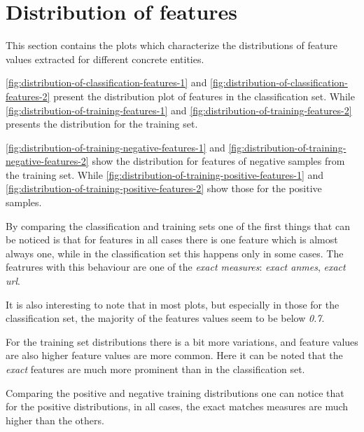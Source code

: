 \documentclass[epsfig,a4paper,11pt,titlepage,twoside,openany]{book}
\begin{document}
\section{Distribution of features}
\label{sec:apx-feature-distribution}

This section contains the plots which characterize the distributions of feature values extracted for different concrete entities. 

\autoref{fig:distribution-of-classification-features-1} and \autoref{fig:distribution-of-classification-features-2} present the distribution plot of features in the classification set. While \autoref{fig:distribution-of-training-features-1} and \autoref{fig:distribution-of-training-features-2} presents the distribution for the training set.

\autoref{fig:distribution-of-training-negative-features-1} and \autoref{fig:distribution-of-training-negative-features-2} show the distribution for features of negative samples from the training set. While \autoref{fig:distribution-of-training-positive-features-1} and \autoref{fig:distribution-of-training-positive-features-2} show those for the positive samples.

By comparing the classification and training sets one of the first things that can be noticed is that for features in all cases there is one feature which is almost always one, while in the classification set this happens only in some cases. The featrures with this behaviour are one of the \textit{exact measures}: \textit{exact anmes}, \textit{exact url}.

It is also interesting to note that in most plots, but especially in those for the classification set, the majority of the features values seem to be below \textit{0.7}.

For the training set distributions there is a bit more variations, and feature values are also higher feature values are more common. Here it can be noted that the \textit{exact} features are much more prominent than in the classification set. 

Comparing the positive and negative training distributions one can notice that for the positive distributions, in all cases, the exact matches measures are much higher than the others.
\end{document}

